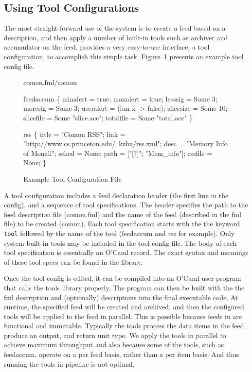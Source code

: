 \subsection{Using Tool Configurations}
\label{sec:tools}

The most straight-forward use of the \padsd{} system is to create a feed based on a \padsd{}
description, and then apply a number of built-in tools such as archiver and
accumulator on the feed. \padsd{} provides a very easy-to-use interface, a tool configuration, 
to accomplish this simple task. 
Figure~\ref{fig:toolconfigs} presents an example tool config file.

\begin{figure}[tb]
\centering
\begin{codebox}
 comon.fml/comon

 feedaccum
\{
  minalert  = true;
  maxalert  = true;
  lesssig   = Some 3;
  moresig   = Some 3;
  useralert = (fun x -> false);
  slicesize = Some 10;
  slicefile = Some "slice.acc";
  totalfile = Some "total.acc"
\}

 rss
\{
  title = "Comon RSS";
  link  = "http://www.cs.princeton.edu/~kzhu/rss.xml";
  desc  = "Memory Info of Monall";
  sched = None; 
  path  = ["[?]"; "Mem_info"];
  rssfile = None; 
\}
\end{codebox}
\caption{Example Tool Configuration File}
\label{fig:toolconfigs}
\end{figure}

A tool configuration includes a feed declaration header (the first line in the config),
and a sequence of tool specifications. The header specifies the path to the 
feed description file (comon.fml) and the name of the feed (described in the fml file) 
to be created (comon).
Each tool specification starts with the the keyword {\tt tool} followed by the
name of the tool (feedaccum and rss for example). Only system built-in tools may be 
included in the tool config file. The body of each tool specification is essentially
an O'Caml record. The exact syntax and meanings of these tool specs can be found in
the \padsd{} library. 

Once the tool config is edited, it can be compiled into an O'Caml user program
that calls the \padsd{} tools library properly. The program can then be built with the the
fml description and (optionally) \padsml{} descriptions into the final executable
code. At runtime, the specified feed will be created and archived, and then the
configured tools will be applied to the feed in parallel. This is possible because feeds in
\padsd{} are functional and immutable. Typically the tools process the data items
in the feed, produce an output, and return unit type. We apply the tools in parallel to
achieve maximum throughput and also because some of the tools, such as feedaccum,
operate on a per feed basis, rather than a per item basis. And thus running the tools
in pipeline is not optimal.

